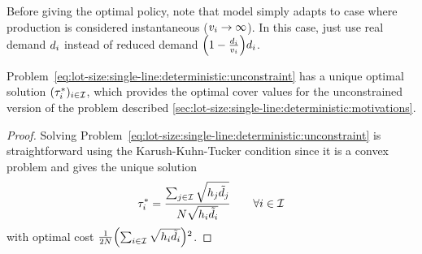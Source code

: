 Before giving the optimal policy, note that model simply adapts to case where production is considered instantaneous (\ie $v_i\rightarrow\infty$).
In this case, just use real demand $d_i$ instead of reduced demand $\bracket{1-\frac{\demand_i}{\rate_i}}\demand_i$.




\begin{prop}
Problem~\eqref{eq:lot-size:single-line:deterministic:unconstraint} has a unique optimal solution $(\tau_i^*)_{i\in\mathcal{I}}$, which provides the optimal cover values for the unconstrained version of the problem described \cref{sec:lot-size:single-line:deterministic:motivations}.
\end{prop}


\begin{proof}
Solving Problem~\eqref{eq:lot-size:single-line:deterministic:unconstraint} is straightforward using the Karush-Kuhn-Tucker condition since it is a convex problem and gives the unique solution
\begin{equation}
  \tau_i^*= \frac{\sum_{j\in\mathcal{I}}\sqrt{h_j\tilde{d}_j}}{N\sqrt{h_i\tilde{d}_i}}\qquad\forall i\in\mathcal{I}
\end{equation}
with optimal cost $\frac{1}{2\nbsetups}\bracket{\sum_{i\in\REF}\sqrt{\holding_i\tilde{\demand_i}}}^2$.
\end{proof}




